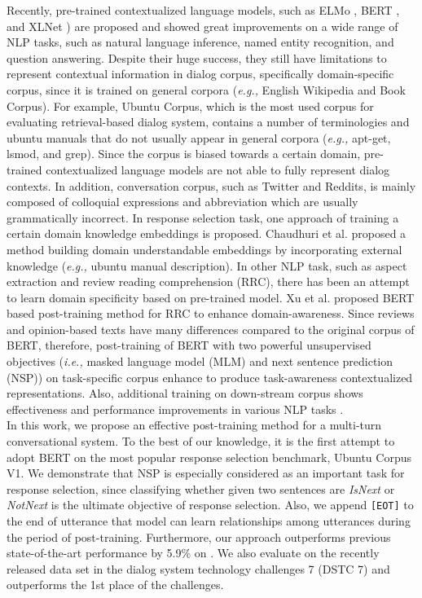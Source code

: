 \documentclass[a4paper]{article}
\begin{document}
\indent Recently, pre-trained contextualized language models, such as ELMo \cite{peters2018deep}, BERT \cite{devlin2018bert}, and XLNet \cite{yang2019xlnet}) are proposed and showed great improvements on a wide range of NLP tasks, such as natural language inference, named entity recognition, and question answering. Despite their huge success, they still have limitations to represent contextual information in dialog corpus, specifically domain-specific corpus, since it is trained on general corpora ({\em{e.g.,}} English Wikipedia and Book Corpus). For example, Ubuntu Corpus, which is the most used corpus for evaluating retrieval-based dialog system, contains a number of terminologies and ubuntu manuals that do not usually appear in general corpora ({\em{e.g.,}} apt-get, lsmod, and grep). Since the corpus is biased towards a certain domain, pre-trained contextualized language models are not able to fully represent dialog contexts. In addition, conversation corpus, such as Twitter and Reddits, is mainly composed of colloquial expressions and abbreviation which are usually grammatically incorrect. In response selection task, one approach of training a certain domain knowledge embeddings is proposed. Chaudhuri et al. \cite{chaudhuri2018improving} proposed a method building domain understandable embeddings by incorporating external knowledge ({\em{e.g.,}} ubuntu manual description). In other NLP task, such as aspect extraction and review reading  comprehension (RRC), there has been an attempt to learn domain specificity based on pre-trained model. Xu et al. \cite{xu2019bert} proposed BERT based post-training method for RRC to enhance domain-awareness. Since reviews and opinion-based texts have many differences compared to the original corpus of BERT, therefore, post-training of BERT with two powerful unsupervised objectives ({\em{i.e.,}} masked language model (MLM) and next sentence prediction (NSP)) on task-specific corpus enhance to produce task-awareness contextualized representations. Also, additional training on down-stream corpus shows effectiveness and performance improvements in various NLP tasks \cite{phang2018sentence,wang2019superglue}. \\
\indent In this work, we propose an effective post-training method for a multi-turn conversational system. To the best of our knowledge, it is the first attempt to adopt BERT on the most popular response selection benchmark, Ubuntu Corpus V1. We demonstrate that NSP is especially considered as an important task for response selection, since classifying whether given two sentences are {\em{IsNext}} or {\em{NotNext}} is the ultimate objective of response selection. Also, we append {\normalsize{\verb|[EOT]|}} to the end of utterance that model can learn relationships among utterances during the period of post-training. 
Furthermore, our approach outperforms previous state-of-the-art performance by 5.9\% on . We also evaluate on the recently released data set in the dialog system technology challenges 7 (DSTC 7) \cite{dstc19task1} and outperforms the 1st place of the challenges.
\end{document}
